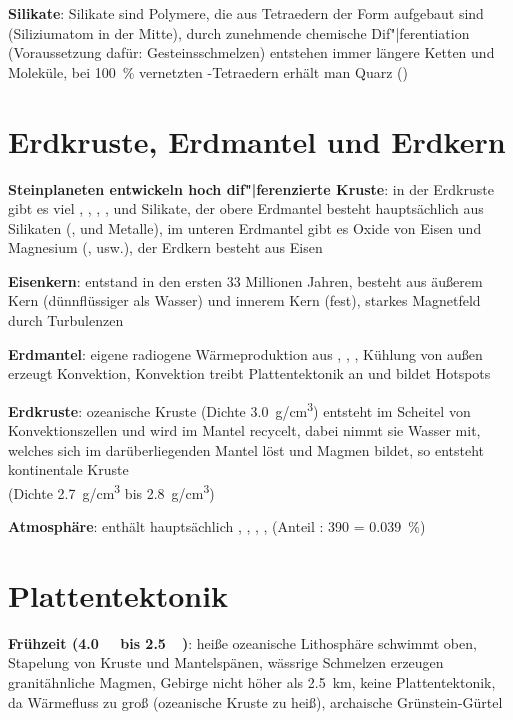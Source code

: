 \textbf{Silikate}:
Silikate sind Polymere, die aus Tetraedern der Form  aufgebaut sind
(Siliziumatom in der Mitte),
durch zunehmende chemische Dif"|ferentiation (Voraussetzung dafür: Gesteinsschmelzen)
entstehen immer längere Ketten und Moleküle,
bei \SI{100}{\percent} vernetzten -Tetraedern erhält man Quarz ()

\section{%
    Erdkruste, Erdmantel und Erdkern%
}

\textbf{Steinplaneten entwickeln hoch dif"|ferenzierte Kruste}:
in der Erdkruste gibt es viel , , , ,  und Silikate,
der obere Erdmantel besteht hauptsächlich aus Silikaten (,  und Metalle),
im unteren Erdmantel gibt es Oxide von Eisen und Magnesium (,  usw.),
der Erdkern besteht aus Eisen

\textbf{Eisenkern}:
entstand in den ersten 33 Millionen Jahren,
besteht aus äußerem Kern (dünnflüssiger als Wasser) und innerem Kern (fest),
starkes Magnetfeld durch Turbulenzen

\textbf{Erdmantel}:
eigene radiogene Wärmeproduktion aus , , ,
Kühlung von außen erzeugt Konvektion,
Konvektion treibt Plattentektonik an und bildet Hotspots

\textbf{Erdkruste}:
ozeanische Kruste (Dichte \SI{3.0}{\gram/\centi\meter\cubed})
entsteht im Scheitel von Konvektionszellen und wird im Mantel recycelt,
dabei nimmt sie Wasser mit, welches sich im darüberliegenden Mantel löst und Magmen bildet,
so entsteht kontinentale Kruste\\
(Dichte \SI{2.7}{\gram/\centi\meter\cubed} bis \SI{2.8}{\gram/\centi\meter\cubed})

\textbf{Atmosphäre}:
enthält hauptsächlich , , , , 
(Anteil : \SI{390}{\ppm} = \SI{0.039}{\percent})

\section{%
    Plattentektonik%
}

\textbf{Frühzeit (\SI{4.0}{\giga\year} bis \SI{2.5}{\giga\year})}:
heiße ozeanische Lithosphäre schwimmt oben,
Stapelung von Kruste und Mantelspänen,
wässrige Schmelzen erzeugen granitähnliche Magmen,
Gebirge nicht höher als \SI{2.5}{\kilo\meter},
keine Plattentektonik, da Wärmefluss zu groß (ozeanische Kruste zu heiß),
archaische Grünstein-Gürtel


